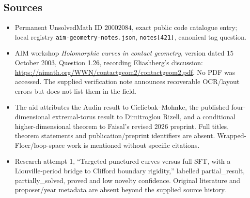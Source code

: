 \documentclass[11pt]{article}
\begin{document}
\subsection{Sources}
\begin{itemize}
\item Permanent UnsolvedMath ID \(20002084\), exact public code catalogue entry; local registry \texttt{aim-geometry-notes.json}, \texttt{notes[421]}, canonical tag question.
\item AIM workshop \emph{Holomorphic curves in contact geometry}, version dated 15 October 2003, Question 1.26, recording Eliashberg's discussion: \url{https://aimath.org/WWN/contactgeom2/contactgeom2.pdf}. No PDF was accessed. The supplied verification note announces recoverable OCR/layout errors but does not list them in the field.
\item The aid attributes the Audin result to Cieliebak--Mohnke, the published four-dimensional extremal-torus result to Dimitroglou Rizell, and a conditional higher-dimensional theorem to Faisal's revised 2026 preprint. Full titles, theorem statements and publication/preprint identifiers are absent. Wrapped-Floer/loop-space work is mentioned without specific citations.
\item Research attempt 1, ``Targeted punctured curves versus full SFT, with a Liouville-period bridge to Clifford boundary rigidity,'' labelled partial\_result, partially\_solved, proved and low novelty confidence. Original literature and proposer/year metadata are absent beyond the supplied source history.
\end{itemize}
\end{document}
